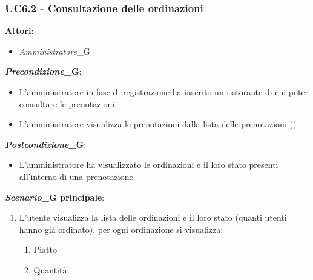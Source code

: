 \subsubsection{UC6.2 - Consultazione delle ordinazioni}\label{usecase:6_2}
\textbf{Attori}:
\begin{itemize}
    \item \textit{Amministratore}_G
\end{itemize}
\textbf{\textit{Precondizione}_G}:
\begin{itemize}
    \item L'amministratore in fase di registrazione ha inserito un ristorante di cui poter consultare le prenotazioni
    \item L'amministratore visualizza le prenotazioni dalla lista delle prenotazioni ()
\end{itemize}
\textbf{\textit{Postcondizione}_G}:
\begin{itemize}
    \item L'amministratore ha visualizzato le ordinazioni e il loro stato presenti all'interno di una prenotazione
\end{itemize}
\textbf{\textit{Scenario}_G principale}:
\begin{enumerate}
    \item L'utente visualizza la lista delle ordinazioni e il loro stato (quanti utenti hanno già ordinato), per ogni ordinazione si visualizza:
    \begin{enumerate}
        \item Piatto
        \item Quantità
    \end{enumerate}
\end{enumerate}
\newpage